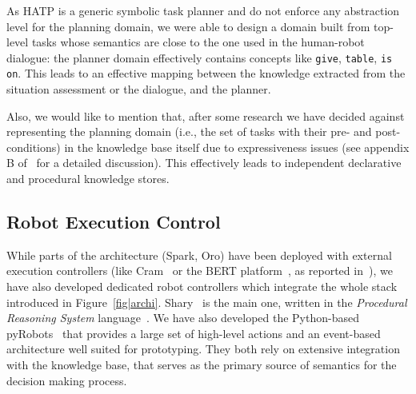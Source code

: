 \documentclass[preprint,3p,times]{elsarticle}
\newcommand{\ie}{i.e.\xspace}
\begin{document}
%
%
%

As HATP is a generic symbolic task planner and do not enforce any abstraction
level for the planning domain, we were able to design a domain built from
top-level tasks whose semantics are close to the one used in the human-robot
dialogue: the planner domain effectively contains concepts like \texttt{give},
\texttt{table}, \texttt{is on}. This leads to an effective mapping between the
knowledge extracted from the situation assessment or the dialogue, and the
planner.

Also, we would like to mention that, after some research we have decided against
representing the planning domain (\ie, the set of tasks with their pre- and
post-conditions) in the knowledge base itself due to expressiveness issues (see
appendix B of~\cite{Lemaignan2012a} for a detailed discussion). This effectively
leads to independent declarative and procedural knowledge stores.

\subsection{Robot Execution Control}
\label{sect|ctrl}

While parts of the architecture ({\sc Spark}, {\sc Oro}) have been deployed with
external execution controllers (like {\sc Cram}~\cite{Beetz2010} or the BERT
platform~\cite{Lallee2010b}, as reported in~\cite{Lemaignan2010}), we have also
developed dedicated robot controllers which integrate the whole stack introduced
in Figure~\ref{fig|archi}. {\sc Shary}~\cite{clodic2008shary} is the main one,
written in the \emph{Procedural Reasoning System} language~\cite{Ingrand1996}.
We have also developed the Python-based {\sc pyRobots}~\cite{lemaignan2015pyrobots} that
provides a large set of high-level actions and an event-based architecture well
suited for prototyping. They both rely on extensive integration with the knowledge
base, that serves as the primary source of semantics for the decision making process.
\end{document}
